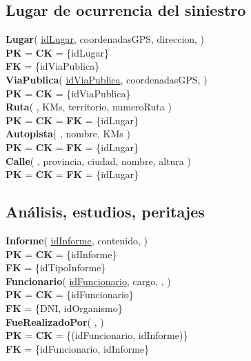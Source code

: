 \subsection{Lugar de ocurrencia del siniestro}

\textbf{Lugar}(
    \uline{idLugar},
    coordenadasGPS,
    direccion,
)\\
\textbf{PK} = \textbf{CK} = \{idLugar\}\\
\textbf{FK} = \{idViaPublica\}\\

\textbf{ViaPublica}(
    \uline{idViaPublica},
    coordenadasGPS,
)\\
\textbf{PK} = \textbf{CK} = \{idViaPublica\}\\


\textbf{Ruta}(
    \uline{},
    KMs,
    territorio,
    numeroRuta
)\\
\textbf{PK} = \textbf{CK} = \textbf{FK} = \{idLugar\}\\

\textbf{Autopista}(
    \uline{},
    nombre,
    KMs
)\\
\textbf{PK} = \textbf{CK} = \textbf{FK} = \{idLugar\}\\


\textbf{Calle}(
    \uline{},
    provincia,
    ciudad,
    nombre,
    altura
)\\
\textbf{PK} = \textbf{CK} = \textbf{FK} = \{idLugar\}\\


\subsection{Análisis, estudios, peritajes}

\textbf{Informe}(
    \uline{idInforme},
    contenido,
)\\
\textbf{PK} = \textbf{CK} = \{idInforme\}\\
\textbf{FK} = \{idTipoInforme\}\\

\textbf{Funcionario}(
    \uline{idFuncionario},
    cargo,
    ,
)\\
\textbf{PK} = \textbf{CK} = \{idFuncionario\}\\
\textbf{FK} = \{DNI, idOrganismo\}\\

\textbf{FueRealizadoPor}(
    ,
)\\
\textbf{PK} = \textbf{CK} = \{(idFuncionario, idInforme)\}\\
\textbf{FK} = \{idFuncionario, idInforme\}\\


